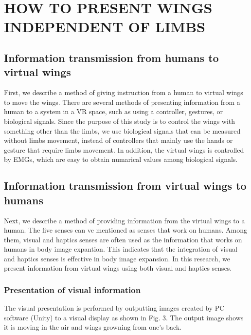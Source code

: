 \documentclass[letterpaper, 10 pt, conference]{ieeeconf}  %
\begin{document}
\section{HOW TO PRESENT WINGS INDEPENDENT OF LIMBS}
        
        \subsection{Information transmission from humans to virtual wings}
                First, we describe a method of giving instruction from a human to virtual wings to move the wings.
                There are several methods of presenting information from a human to a system in a VR space, such as using a controller, gestures, or biological signals.
                Since the purpose of this study is to control the wings with something other than the limbs, we use biological signals that can be measured without limbs movement, instead of controllers that mainly use the hands or gesture that require limbs movement.
                In addition, the virtual  wings is controlled by EMGs, which are easy to obtain numarical values among biological signals.

        \subsection{Information transmission from virtual wings to humans}
                Next, we describe a method of providing information from the virtual wings to a human. 
                The five senses can ve mentioned as senses that work on humans.
                Among them, visual and haptics senses are often used as the information that works on humans in body image expantion.  
                This indicates that the integration of visual and haptics senses is effective in body image expansion. 
                In this research, we present information from virtual wings using both visual and haptics senses.  

                \subsubsection{Presentation of visual information}
                

                        The visual presentation is performed by outputting images created by PC software (Unity) to a visual display as shown in Fig. 3. 
                        The output image shows it is moving in the air and wings growning from one's back.
\end{document}
